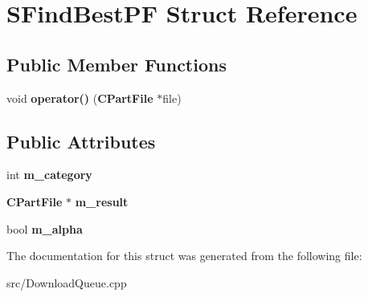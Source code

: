 \section{SFindBestPF Struct Reference}
\label{structSFindBestPF}
\subsection*{Public Member Functions}
\begin{DoxyCompactItemize}
\item 
void {\bfseries operator()} ({\bf CPartFile} $\ast$file)\label{structSFindBestPF_a1d2ea4ea965e534639b0baecb7b50ec2}

\end{DoxyCompactItemize}
\subsection*{Public Attributes}
\begin{DoxyCompactItemize}
\item 
int {\bf m\_\-category}\label{structSFindBestPF_a4c316ccab608db0d0f4314ea9b30cd47}

\item 
{\bf CPartFile} $\ast$ {\bf m\_\-result}\label{structSFindBestPF_ad1ae7e7261de6c566f8bf2f710143dd4}

\item 
bool {\bf m\_\-alpha}\label{structSFindBestPF_af2daa9b1fc8848fc7b7f55c60b9863ab}

\end{DoxyCompactItemize}


The documentation for this struct was generated from the following file:\begin{DoxyCompactItemize}
\item 
src/DownloadQueue.cpp\end{DoxyCompactItemize}
